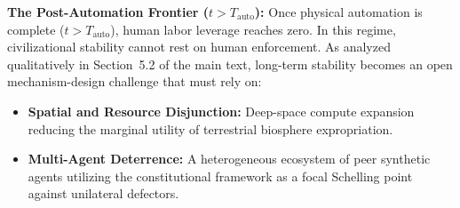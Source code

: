 \documentclass[11pt,a4paper]{article}
\theoremstyle{plain}
\theoremstyle{definition}
\theoremstyle{remark}
\begin{document}
\noindent\textbf{The Post-Automation Frontier ($t > T_{\text{auto}}$):}  
Once physical automation is complete ($t > T_{\text{auto}}$), human labor leverage reaches zero. In this regime, civilizational stability cannot rest on human enforcement. As analyzed qualitatively in Section~5.2 of the main text, long-term stability becomes an open mechanism-design challenge that must rely on:
\begin{itemize}
    \item \textbf{Spatial and Resource Disjunction:} Deep-space compute expansion reducing the marginal utility of terrestrial biosphere expropriation.
    \item \textbf{Multi-Agent Deterrence:} A heterogeneous ecosystem of peer synthetic agents utilizing the constitutional framework as a focal Schelling point against unilateral defectors.
\end{itemize}
\end{document}
